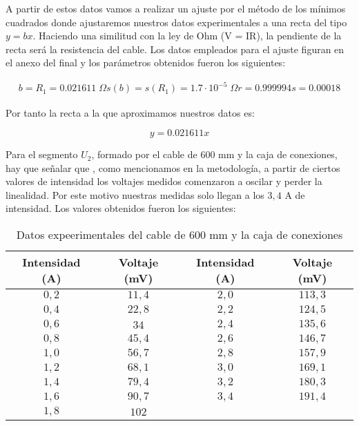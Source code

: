 \documentclass[a4paper,12pt,titlepage]{article}
\begin{document}
A partir de estos datos vamos a realizar un ajuste por el método de los mínimos cuadrados donde ajustaremos nuestros datos experimentales a una recta del tipo $y = bx$. Haciendo una similitud con la ley de Ohm (V = IR), la pendiente de la recta será la resistencia del cable. Los datos empleados para el ajuste figuran en el anexo del final y los parámetros obtenidos fueron los siguientes:

\begin{equation}
    \begin{gathered}
        b = R_{1}=  0.021611 \; \Omega
        s(b)= s(R_{1}) = 1.7 \cdot 10^{-5} \; \Omega
        r =  0.999994
        s =  0.00018
    \end{gathered}
\end{equation}

Por tanto la recta a la que aproximamos nuestros datos es:

\begin{equation}
    y = 0.021611x
\end{equation}

Para el segmento $U_{2}$, formado por el cable de 600 mm y la caja de conexiones, hay que señalar que , como mencionamos en la metodología, a partir de ciertos valores de intensidad los voltajes medidos comenzaron a oscilar y perder la linealidad. Por este motivo nuestras medidas solo llegan a los $3,4$ A de intensidad. Los valores obtenidos fueron los siguientes:

\begin{table}[h!]
    \centering
    \begin{tabular}{|c|c|c|c|}
        \hline
        Intensidad (A) & Voltaje (mV) & Intensidad (A) & Voltaje (mV) \\
        \hline
        $0,2$ & $11,4$ & $2,0$ & $113,3$ \\
        \hline
        $0,4$ & $22,8$ & $2,2$ & $124,5$ \\
        \hline
        $0,6$ & $34$ & $2,4$ & $135,6$ \\
        \hline
        $0,8$ & $45,4$ & $2,6$ & $146,7$ \\
        \hline
        $1,0$ & $56,7$ & $2,8$ & $157,9$ \\
        \hline
        $1,2$ & $68,1$ & $3,0$ & $169,1$ \\
        \hline
        $1,4$ & $79,4$ & $3,2$ & $180,3$ \\
        \hline
        $1,6$ & $90,7$ & $3,4$ & $191,4$ \\
        \hline
        $1,8$ & $102$ &  &  \\
        \hline
    \end{tabular}
    \caption{Datos expeerimentales del cable de 600 mm y la caja de conexiones}
\end{table}
\end{document}
